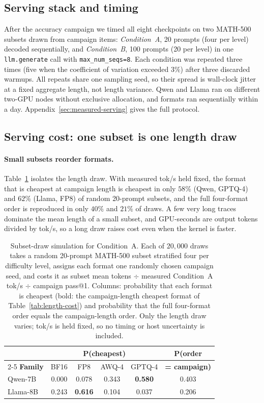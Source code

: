 \documentclass[11pt,a4paper]{article}
\begin{document}
\subsection{Serving stack and timing}
\label{sec:serving-timing}
After the accuracy campaign we timed all eight checkpoints on two MATH-500 subsets drawn from campaign items: \emph{Condition~A}, 20 prompts (four per level) decoded sequentially, and \emph{Condition~B}, 100 prompts (20 per level) in one \texttt{llm.generate} call with \texttt{max\_num\_seqs=8}. Each condition was repeated three times (five when the coefficient of variation exceeded $3\%$) after three discarded warmups. All repeats share one sampling seed, so their spread is wall-clock jitter at a fixed aggregate length, not length variance. Qwen and Llama ran on different two-GPU nodes without exclusive allocation, and formats ran sequentially within a day. Appendix~\ref{sec:measured-serving} gives the full protocol.

\subsection{Serving cost: one subset is one length draw}
\label{sec:cost-results}
\paragraph{Small subsets reorder formats.} Table~\ref{tab:subsetsim} isolates the length draw. With measured tok/s held fixed, the format that is cheapest at campaign length is cheapest in only $58\%$ (Qwen, GPTQ-4) and $62\%$ (Llama, FP8) of random 20-prompt subsets, and the full four-format order is reproduced in only $40\%$ and $21\%$ of draws. A few very long traces dominate the mean length of a small subset, and GPU-seconds are output tokens divided by tok/s, so a long draw raises cost even when the kernel is faster.

\begin{table}[t]
\centering
\caption{Subset-draw simulation for Condition~A. Each of $20{,}000$ draws takes a random 20-prompt MATH-500 subset stratified four per difficulty level, assigns each format one randomly chosen campaign seed, and costs it as subset mean tokens $\div$ measured Condition~A tok/s $\div$ campaign pass@1. Columns: probability that each format is cheapest (bold: the campaign-length cheapest format of Table~\ref{tab:length-cost}) and probability that the full four-format order equals the campaign-length order. Only the length draw varies; tok/s is held fixed, so no timing or host uncertainty is included.}
\label{tab:subsetsim}
\small
\begin{tabular}{lccccc}
\toprule
 & \multicolumn{4}{c}{\textbf{P(cheapest)}} & \textbf{P(order} \\
\cmidrule(lr){2-5}
\textbf{Family} & BF16 & FP8 & AWQ-4 & GPTQ-4 & \textbf{= campaign)} \\
\midrule
Qwen-7B & 0.000 & 0.078 & 0.343 & \textbf{0.580} & 0.403 \\
Llama-8B & 0.243 & \textbf{0.616} & 0.104 & 0.037 & 0.206 \\
\bottomrule
\end{tabular}
\end{table}
\end{document}
